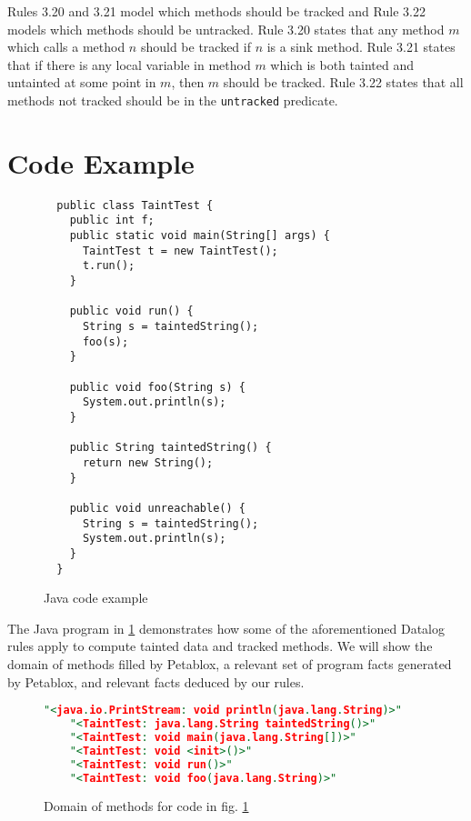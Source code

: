 Rules 3.20 and 3.21 model which methods should be tracked and Rule
3.22 models which methods should be untracked. Rule 3.20 states that
any method $m$ which calls a method $n$ should be tracked if $n$ is a
sink method. Rule 3.21 states that if there is any local variable in
method $m$ which is both tainted and untainted at some point in $m$,
then $m$ should be tracked. Rule 3.22 states that all methods not
tracked should be in the \texttt{untracked} predicate.

\section{Code Example} \label{ex}

\begin{figure}[H]
\begin{lstlisting}
  public class TaintTest {
    public int f;
    public static void main(String[] args) {
      TaintTest t = new TaintTest();
      t.run();
    }

    public void run() {
      String s = taintedString();
      foo(s);
    }

    public void foo(String s) {
      System.out.println(s);
    }

    public String taintedString() {
      return new String();
    }
    
    public void unreachable() {
      String s = taintedString();
      System.out.println(s);
    }
  }
\end{lstlisting}
\caption{Java code example}\label{fig:ex}
\end{figure}

The Java program in \ref{fig:ex} demonstrates how some of the
aforementioned Datalog rules apply to compute tainted data and tracked
methods. We will show the domain of methods filled by Petablox, a
relevant set of program facts generated by Petablox, and relevant
facts deduced by our rules.

\begin{figure}[H]
  \begin{lstlisting}[language=Prolog]
    "<java.io.PrintStream: void println(java.lang.String)>"
    "<TaintTest: java.lang.String taintedString()>"
    "<TaintTest: void main(java.lang.String[])>"
    "<TaintTest: void <init>()>"
    "<TaintTest: void run()>"
    "<TaintTest: void foo(java.lang.String)>"
  \end{lstlisting}
  \caption{Domain of methods for code in fig. \ref{fig:ex}}\label{fig:domM}
\end{figure}

